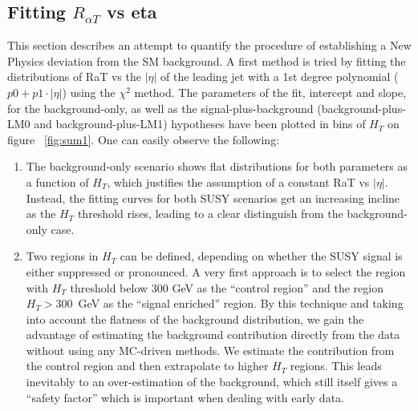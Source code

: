 
\subsection{Fitting $R_{\alpha T}$ vs eta}

This section describes an attempt to quantify the procedure of establishing a New Physics deviation from the SM background. A first method is tried by fitting the distributions of RaT vs the $|\eta|$ of the leading jet with a 1st degree polynomial ($p0 + p1 \cdot |\eta|$) using the $\chi^{2}$ method. The parameters of the fit, intercept and slope, for the background-only, as well as the signal-plus-background (background-plus-LM0 and background-plus-LM1) hypotheses have been plotted in bins of $H_{T}$ on figure ~\ref{fig:sum1}. One can easily observe the following:
\begin{enumerate}
 \item The background-only scenario shows flat distributions for both parameters as a function of $H_{T}$, which justifies the assumption of a constant RaT vs $|\eta|$. Instead, the fitting curves for both SUSY scenarios get an increasing incline as the $H_{T}$ threshold rises, leading to a clear distinguish from the background-only case.

\item Two regions in $H_{T}$ can be defined, depending on whether the SUSY signal is either suppressed or pronounced. A very first approach is to select the region with $H_{T}$ threshold below 300 GeV as the ``control region'' and the region $H_{T}>300$~GeV as the ``signal enriched'' region. By this technique and taking into account the flatness of the background distribution, we gain the advantage of estimating the background contribution directly from the data without using any MC-driven methods. We estimate the contribution from the control region and then extrapolate to higher $H_{T}$ regions. This leads inevitably to an over-estimation of the background, which still itself gives a ``safety factor'' which is important when dealing with early data.
\end{enumerate}

